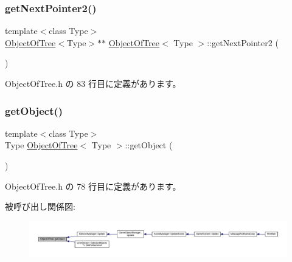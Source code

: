 \subsubsection{\texorpdfstring{get\+Next\+Pointer2()}{getNextPointer2()}}
{\footnotesize\ttfamily template$<$class Type$>$ \\
\mbox{\hyperlink{class_object_of_tree}{Object\+Of\+Tree}}$<$Type$>$$\ast$$\ast$ \mbox{\hyperlink{class_object_of_tree}{Object\+Of\+Tree}}$<$ Type $>$\+::get\+Next\+Pointer2 (\begin{DoxyParamCaption}{ }\end{DoxyParamCaption})\hspace{0.3cm}{\ttfamily [inline]}}



 Object\+Of\+Tree.\+h の 83 行目に定義があります。

\mbox{\label{class_object_of_tree_a28214e15fffb72cb50b764e2f3ac863d}} 
\subsubsection{\texorpdfstring{get\+Object()}{getObject()}}
{\footnotesize\ttfamily template$<$class Type$>$ \\
Type \mbox{\hyperlink{class_object_of_tree}{Object\+Of\+Tree}}$<$ Type $>$\+::get\+Object (\begin{DoxyParamCaption}{ }\end{DoxyParamCaption})\hspace{0.3cm}{\ttfamily [inline]}}



 Object\+Of\+Tree.\+h の 78 行目に定義があります。

被呼び出し関係図\+:
\nopagebreak
\begin{figure}[H]
\begin{center}
\leavevmode
\includegraphics[width=350pt]{class_object_of_tree_a28214e15fffb72cb50b764e2f3ac863d_icgraph}
\end{center}
\end{figure}
\mbox{\label{class_object_of_tree_a02b74f20b90ec53dbae2d18648a9d5d1}} 
